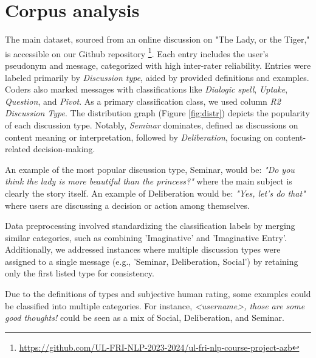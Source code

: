\documentclass[fleqn,moreauthors,10pt]{ds_report}
\begin{document}
\section*{Corpus analysis}
The main dataset, sourced from an online discussion on "The Lady, or the Tiger," is accessible on our Github repository \footnote{\url{https://github.com/UL-FRI-NLP-2023-2024/ul-fri-nlp-course-project-azb}}. Each entry includes the user's pseudonym and message, categorized with high inter-rater reliability. Entries were labeled primarily by \textit{Discussion type}, aided by provided definitions and examples. Coders also marked messages with classifications like \textit{Dialogic spell}, \textit{Uptake}, \textit{Question}, and \textit{Pivot}. As a primary classification class, we used column \textit{R2 Discussion Type}. The distribution graph (Figure \ref{fig:distr}) depicts the popularity of each discussion type. Notably, \textit{Seminar} dominates, defined as discussions on content meaning or interpretation, followed by \textit{Deliberation}, focusing on content-related decision-making. 

An example of the most popular discussion type, Seminar, would be: \textit{"Do you think the lady is more beautiful than the princess?"} where the main subject is clearly the story itself. An example of Deliberation would be: \textit{"Yes, let's do that"} where users are discussing a decision or action among themselves.

Data preprocessing involved standardizing the classification labels by merging similar categories, such as combining 'Imaginative' and 'Imaginative Entry'. Additionally, we addressed instances where multiple discussion types were assigned to a single message (e.g., 'Seminar, Deliberation, Social') by retaining only the first listed type for consistency.

Due to the definitions of types and subjective human rating, some examples could be classified into multiple categories. For instance, \textit{\textless username\textgreater , those are some good thoughts!} could be seen as a mix of Social, Deliberation, and Seminar.
\end{document}
